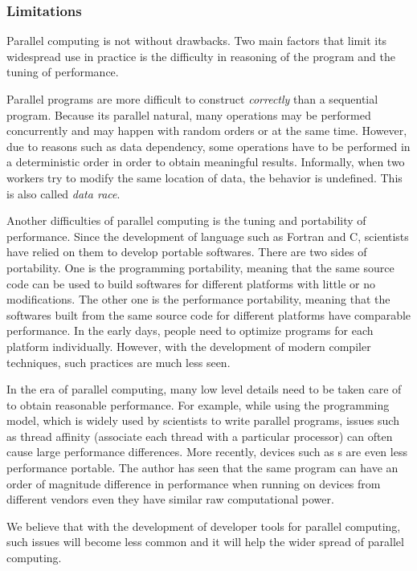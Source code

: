 \subsubsection{Limitations}
\label{ssub:Limitations}

Parallel computing is not without drawbacks. Two main factors that limit its
widespread use in practice is the difficulty in reasoning of the program and
the tuning of performance.

Parallel programs are more difficult to construct \emph{correctly} than a
sequential program. Because its parallel natural, many operations may be
performed concurrently and may happen with random orders or at the same time.
However, due to reasons such as data dependency, some operations have to be
performed in a deterministic order in order to obtain meaningful results.
Informally, when two workers try to modify the same location of data, the
behavior is undefined. This is also called \emph{data race}.

Another difficulties of parallel computing is the tuning and portability of
performance. Since the development of language such as Fortran and C,
scientists have relied on them to develop portable softwares. There are two
sides of portability. One is the programming portability, meaning that the
same source code can be used to build softwares for different platforms with
little or no modifications. The other one is the performance portability,
meaning that the softwares built from the same source code for different
platforms have comparable performance. In the early days, people need to
optimize programs for each platform individually. However, with the
development of modern compiler techniques, such practices are much less seen.

In the era of parallel computing, many low level details need to be taken care
of to obtain reasonable performance. For example, while using the \openmp
programming model, which is widely used by scientists to write parallel
programs, issues such as thread affinity (associate each thread with a
particular processor) can often cause large performance differences. More
recently, devices such as \gpu{}s are even less performance portable. The
author has seen that the same \opencl \cite{opencl} program can have an order
of magnitude difference in performance when running on devices from different
vendors even they have similar raw computational power.

We believe that with the development of developer tools for parallel
computing, such issues will become less common and it will help the wider
spread of parallel computing.

